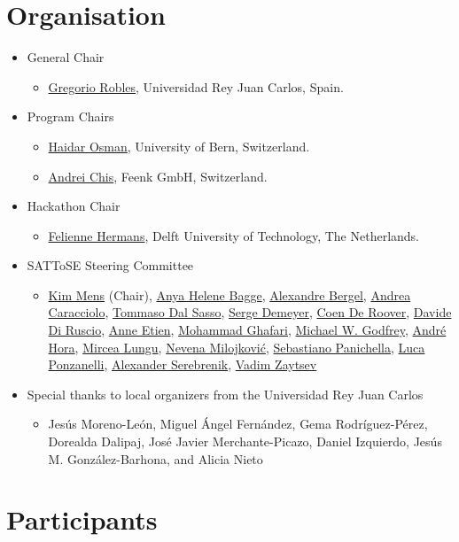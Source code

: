 \documentclass[11pt]{article}
\begin{document}
\section*{Organisation}
\begin{itemize}
 \item General Chair
 \begin{itemize}
  \item \href{https://gsyc.urjc.es/~grex/}{Gregorio Robles}, Universidad Rey Juan Carlos, Spain.
 \end{itemize}
 \item Program Chairs
 \begin{itemize}
  \item \href{http://scg.unibe.ch/staff/osman}{Haidar Osman}, University of Bern, Switzerland.
  \item \href{http://scg.unibe.ch/staff/andreichis}{Andrei Chis}, Feenk GmbH, Switzerland.
 \end{itemize}
 \item Hackathon Chair
 \begin{itemize}
  \item \href{http://www.felienne.com/}{Felienne Hermans}, Delft University of Technology, The Netherlands.
 \end{itemize}
 \item SATToSE Steering Committee
 \begin{itemize}
  \item \href{https://released.info.ucl.ac.be/Members/KimMens}{Kim Mens} (Chair), \href{http://www.ii.uib.no/~anya/}{Anya Helene Bagge}, \href{http://bergel.eu/}{Alexandre Bergel}, \href{https://caracciolo.github.io/}{Andrea Caracciolo}, \href{http://www.inf.usi.ch/phd/dalsat/index.php}{Tommaso Dal Sasso}, \href{http://win.ua.ac.be/~sdemey/}{Serge Demeyer}, \href{http://prog.vub.ac.be/~cderoove}{Coen De Roover}, \href{http://www.di.univaq.it/diruscio/}{Davide Di Ruscio}, \href{http://www.lifl.fr/~etien}{Anne Etien}, \href{http://scg.unibe.ch/staff/Mohammad-Ghafari}{Mohammad Ghafari}, \href{http://plg.uwaterloo.ca/~migod/}{Michael W. Godfrey}, \href{https://sites.google.com/site/andrehoraa/}{André Hora}, \href{https://mircealungu.github.io/}{Mircea Lungu}, \href{http://scg.unibe.ch/staff/Milojkovic}{Nevena Milojković}, \href{http://www.ifi.uzh.ch/en/seal/people/panichella.html}{Sebastiano Panichella}, \href{http://www.inf.usi.ch/phd/ponzanelli/}{Luca Ponzanelli}, \href{http://www.win.tue.nl/~aserebre/}{Alexander Serebrenik}, \href{http://grammarware.net/}{Vadim Zaytsev}
 \end{itemize}
  \item Special thanks to local organizers from the Universidad Rey Juan Carlos
  \begin{itemize}
   \item Jesús Moreno-León, Miguel Ángel Fernández, Gema Rodríguez-Pérez, Dorealda Dalipaj, José Javier Merchante-Picazo, Daniel Izquierdo, Jesús M. González-Barhona, and Alicia Nieto
  \end{itemize}
\end{itemize}

\section*{Participants}


\end{document}
